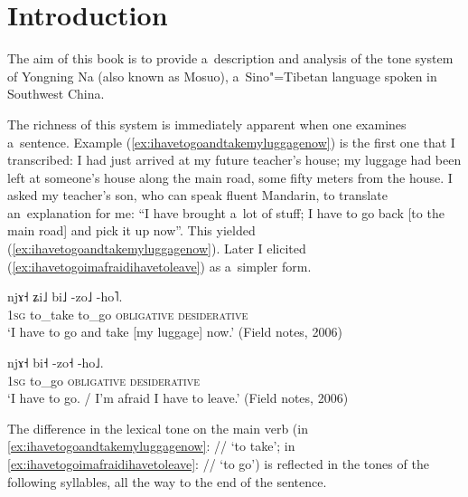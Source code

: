 \chapter{Introduction}
\label{chap:introduction}
\label{chap:1}


The aim of this book is to provide a~description and analysis of the tone system of
Yongning Na (also known as Mosuo), a~Sino"=Tibetan language spoken in Southwest China.

The richness of this system is immediately apparent when one examines a~sentence. Example (\ref{ex:ihavetogoandtakemyluggagenow}) is the
first one that I transcribed: I had just arrived at my future teacher’s house; my luggage had
been left at someone’s house along the main road, some fifty meters from the house. I asked my
teacher’s son, who can speak fluent Mandarin, to translate an~explanation for me: “I have brought
a~lot of stuff; I have to go back [to the main road] and pick it up now”. This yielded (\ref{ex:ihavetogoandtakemyluggagenow}). Later I
elicited (\ref{ex:ihavetogoimafraidihavetoleave}) as a~simpler form.

\begin{exe}
  \ex \label{1}
  \begin{xlist}
    \ex
    \label{ex:ihavetogoandtakemyluggagenow}\label{1a}
    \gll njɤ˧	ʑi˩	bi˩	-zo˩	-ho˥.\\
    \textsc{1sg}	to\_take	to\_go	\textsc{obligative}	\textsc{desiderative}\\
    \glt ‘I have to go and take [my luggage] now.' (Field notes, 2006)

    \ex
    \label{ex:ihavetogoimafraidihavetoleave}\label{1b}
    \gll	njɤ˧	bi˧	-zo˧	-ho˩.\\
    \textsc{1sg}	to\_go	\textsc{obligative}	\textsc{desiderative}\\
    \glt ‘I have to go. / I’m afraid I have to leave.' (Field notes, 2006)
  \end{xlist}
\end{exe}

The difference in the lexical tone on the main verb (in \ref{ex:ihavetogoandtakemyluggagenow}: //
‘to take’; in \ref{ex:ihavetogoimafraidihavetoleave}: // ‘to go’) is reflected in the tones of the following syllables, all the way to the end of the
sentence.

